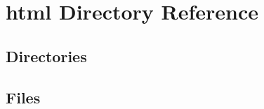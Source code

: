 \section{html Directory Reference}
\label{dir_129344e98795163a60166c193d052639}
\subsection*{Directories}
\begin{DoxyCompactItemize}
\end{DoxyCompactItemize}
\subsection*{Files}
\begin{DoxyCompactItemize}
\end{DoxyCompactItemize}

